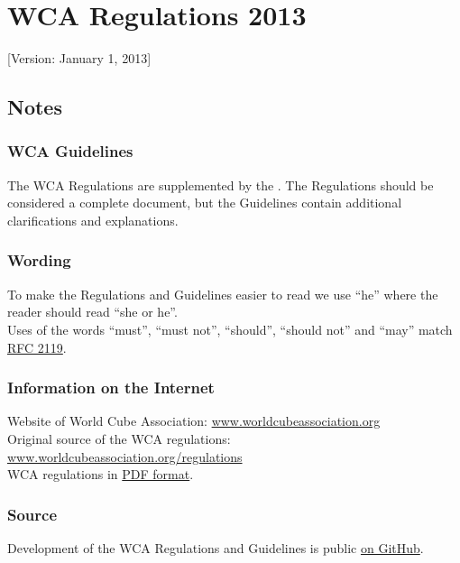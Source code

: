 \section{ WCA Regulations 2013}

{[}Version: January 1, 2013{]}

\subsection{Notes}

\subsubsection{WCA Guidelines}

The WCA Regulations are supplemented by the . The Regulations should be
considered a complete document, but the Guidelines contain additional
clarifications and explanations.

\subsubsection{Wording}

To make the Regulations and Guidelines easier to read we use ``he''
where the reader should read ``she or he''.\\Uses of the words ``must'',
``must not'', ``should'', ``should not'' and ``may'' match
\href{https://www.ietf.org/rfc/rfc2119.txt}{RFC 2119}.

\subsubsection{Information on the Internet}

Website of World Cube Association:
\href{http://www.worldcubeassociation.org/}{www.worldcubeassociation.org}\\Original
source of the WCA regulations:
\href{http://www.worldcubeassociation.org/regulations/}{www.worldcubeassociation.org/regulations}\\WCA
regulations in \href{wca-regulations-and-guidelines-2013.pdf}{PDF
format}.

\subsubsection{Source}

Development of the WCA Regulations and Guidelines is public
\href{https://github.com/cubing/wca-documents}{on GitHub}.

